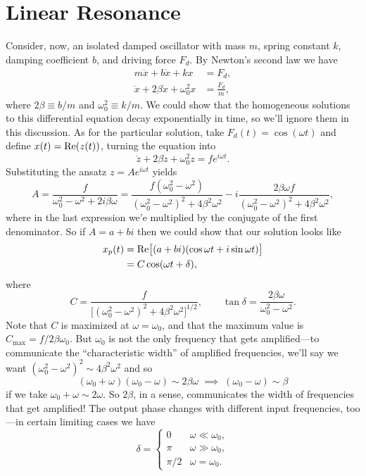\documentclass[../p111main.tex]{subfiles}
\begin{document}
\pagebreak

\section{Linear Resonance}
Consider, now, an isolated damped oscillator with mass $m$, spring constant $k$, damping coefficient $b$, and driving force $F_d$.
By Newton's second law we have
\begin{align*}
    m \ddot x + b \dot x + k x &= F_d, \\
    \ddot x + 2\beta \dot x + \omega_0^2 x &= \frac{F_d}{m},
\end{align*}
where $2\beta \equiv b / m$ and $\omega_0^2 \equiv k / m$.
We could show that the homogeneous solutions to this differential equation decay exponentially in time, so we'll ignore them in this discussion.
As for the particular solution, take $F_d(t) = \cos (\omega t)$ and define $x(t) = \textrm{Re}(z(t))$, turning the equation into
\[ \ddot z + 2\beta \dot z + \omega_0^2 z = f e^{i\omega t}. \]
Substituting the ansatz $z = Ae^{i \omega t}$ yields
\[ A = \frac{f}{\omega_0^2 - \omega^2 + 2i \beta \omega} = \frac{f(\omega_0^2 - \omega^2)}{(\omega_0^2 - \omega^2)^2 + 4\beta^2 \omega^2} - i \frac{2\beta\omega f}{(\omega_0^2 - \omega^2)^2 + 4\beta^2 \omega^2}, \]
where in the last expression we'e multiplied by the conjugate of the first denominator.
So if $A = a + bi$ then we could show that our solution looks like
\begin{align*}
    x_p(t) &= \textrm{Re} \big[ (a + bi)(\cos \omega t + i \sin \omega t) \big] \\
    &= C \cos (\omega t + \delta),
\end{align*}
where
\[ C = \frac{f}{\big[ (\omega_0^2 - \omega^2)^2 + 4\beta^2 \omega^2 \big]^{1 / 2}}, \qquad \tan \delta = \frac{2\beta \omega}{\omega_0^2 - \omega^2}. \]
Note that $C$ is maximized at $\omega = \omega_0$, and that the maximum value is $C_\textrm{max} = f / 2\beta \omega_0$.
But $\omega_0$ is not the only frequency that gets amplified---to communicate the ``characteristic width'' of amplified frequencies, we'll say we want $(\omega_0^2 - \omega^2)^2 \sim 4 \beta^2 \omega^2$ and so
\[ (\omega_0 + \omega)(\omega_0 - \omega) \sim 2\beta \omega \;\implies\; (\omega_0 - \omega) \sim \beta \]
if we take $\omega_0 + \omega \sim 2\omega$.
So $2\beta$, in a sense, communicates the width of frequencies that get amplified!
The output phase changes with different input frequencies, too---in certain limiting cases we have
\[ \delta = \begin{cases} 0 & \omega \ll \omega_0, \\ \pi & \omega \gg \omega_0, \\ \pi / 2 & \omega = \omega_0. \end{cases} \]
\end{document}

